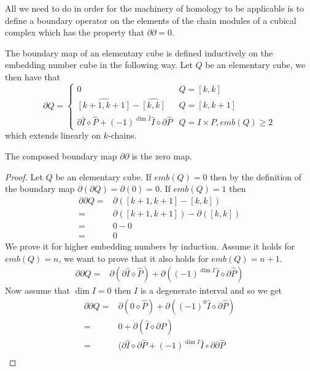 \begin{example}
All we need to do in order for the machinery of homology to be applicable is to define a boundary operator on the elements of the chain modules of a cubical complex which has the property that $\partial \partial = 0$.
\begin{definition}
  The boundary map of an elementary cube is defined inductively on the embedding number cube in the following way. Let $Q$ be an elementary cube, we then have that
  \[ \partial \hat Q =
    \begin{cases}
      0 & Q = [k,k] \\
      \widehat{[k+1,k+1]} - \widehat{[k,k]} & Q = [k,k+1] \\
      \partial \hat I \diamond \hat P +(-1)^{\dim \hat I} \hat I \diamond \partial \hat P & Q=I \times P, emb(Q) \geq 2
    \end{cases}
  \]
  which extends linearly on $k$-chains.
\end{definition}
\begin{theorem}
The composed boundary map $\partial \partial$ is the zero map.
\end{theorem}
\begin{proof}
  Let $Q$ be an elementary cube. If $emb(Q)=0$ then by the definition of the boundary map $\partial (\partial Q) = \partial(0) = 0$. If $emb(Q)=1$ then
  \begin{align*}
    \partial \partial Q =& \partial([k+1,k+1]-[k,k]) \\ =&\partial([k+1,k+1])-\partial([k,k])
                                                          \\=&0-0\\=&0
  \end{align*}
We prove it for higher embedding numbers by induction. Assume it holds for $emb(Q)=n$, we want to prove that it also holds for $emb(Q)=n+1$.
\begin{align*}
  \partial \partial Q =& \partial(\partial \hat I \diamond \hat P) + \partial((-1)^{\dim I} \hat I \diamond \partial \hat P)
\end{align*}
Now assume that $\dim I = 0$ then $I$ is a degenerate interval and so we get
\begin{align*}
  \partial \partial Q =& \partial(0 \diamond \hat P) + \partial((-1)^{0} \hat I \diamond \partial \hat P) \\
  =& 0 + \partial( \hat I \diamond \partial \hat P) \\
  =& (\partial \hat I \diamond \partial \hat P + (-1)^{\dim I} \hat I \circ \partial \partial \hat P \\

\end{align*}
\end{proof}
\end{example}

